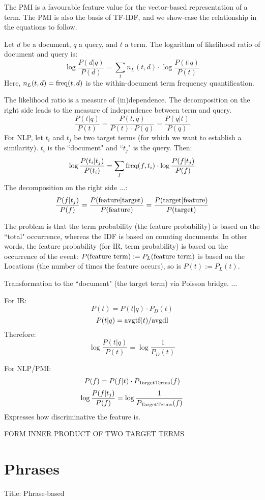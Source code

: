 The PMI is a favourable feature value for the vector-based representation
of a term.
The PMI is also the basis of TF-IDF, and we show-case the relationship
in the equations to follow.

Let $d$ be a document, $q$ a query, and $t$ a term.
The logarithm of likelihood ratio of document and query is:
\[
\log\frac{P(d|q)}{P(d)} =
	\sum_t n_L(t,d) \cdot \log\frac{P(t|q)}{P(t)}
\]
Here, $n_L(t,d)=\textmd{freq}(t,d)$ is the within-document term frequency
quantification.

The likelihood ratio is a measure of (in)dependence.
The decomposition on the right side leads to the measure of independence
between term and query.
\[
\frac{P(t|q)}{P(t)} = \frac{P(t,q)}{P(t) \cdot P(q)} = \frac{P(q|t)}{P(q)}
\]
For NLP, let $t_i$ and $t_j$ be two target terms
(for which we want to establish a similarity).
$t_i$ is the ``document" and ``$t_j$" is the query.
Then:
\[
\log\frac{P(t_i|t_j)}{P(t_i)} =
	\sum_f \textmd{freq}(f,t_i) \cdot \log\frac{P(f|t_j)}{P(f)}
\]
The decomposition on the right side ...:
\[
\frac{P(f|t_j)}{P(f)} =
\frac{P(\textmd{feature}|\textmd{target})}{P(\textmd{feature})} =
\frac{P(\textmd{target}|\textmd{feature})}{P(\textmd{target})}
\]

The problem is that the term probability (the feature probability)
is based on the ``total" occurrence, whereas the IDF is based
on counting documents.
In other words,
the feature probability (for IR, term probability) is based on
the occurrence of the event:
$P(\textmd{feature term}):=P_L(\textmd{feature term})$
is based on the Locations (the number of times the feature occurs), so is
$P(t):=P_L(t)$.

Transformation to the ``document" (the target term) via Poisson bridge.
...

For IR:
\[
P(t) = P(t|q) \cdot P_D(t)
\]
\[
P(t|q) = \textmd{avgtf}(t) / \textmd{avgdl}
\]
Therefore:
\[
\log\frac{P(t|q)}{P(t)} = \log\frac{1}{P_D(t)}
\]

For NLP/PMI:
\[
P(f) = P(f|t) \cdot P_\textmd{TargetTerms}(f)
\]
\[
\log\frac{P(f|t_j)}{P(f)} = \log\frac{1}{P_\textmd{TargetTerms}(f)}
\]
Expresses how discriminative the feature is.


FORM INNER PRODUCT OF TWO TARGET TERMS


\section{Phrases}

Title: Phrase-based


